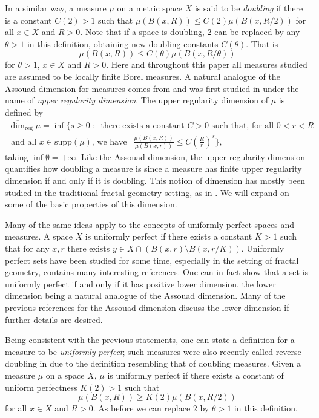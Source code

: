 In a similar way, a measure $\mu$ on a metric space $X$ is said to be \textit{doubling} if there is a constant $C(2) > 1$ such that $\mu(B(x,R)) \le C(2) \mu(B(x,R/2))$ for all $x \in X$ and $R> 0$. Note that if a space is doubling, $2$ can be replaced by any $\theta > 1$ in this definition, obtaining new doubling constants $C(\theta)$. That is 
\[
\mu(B(x,R)) \le C(\theta) \mu(B(x,R/\theta))
\]
for $\theta > 1$, $x\in X$ and $R > 0$. Here and throughout this paper all measures studied are assumed to be locally finite Borel measures. A natural analogue of the Assouad dimension for measures comes from \cite{konyagin, luksak} and was first studied in \cite{anti1} under the name of \textit{upper regularity dimension}. The upper regularity dimension of $\mu$ is defined by 
\begin{multline*} 
\overline{\dim}_{\text{reg}} \mu = \inf \Bigg\{ s \geq 0 \, \,  : \,  \text{ there exists a  constant }C  > 0\text{  such that, for all  $0< r< R $} \\ \text{  and all $x \in \text{supp} (\mu)$, we have }  \ \  \frac{\mu(B(x,R))}{\mu(B(x,r))} \leq C\left(\frac{R}{r}\right)^{s} \Bigg\},
\end{multline*}
taking $\inf \emptyset = + \infty$. Like the Assouad dimension, the upper regularity dimension quantifies how doubling a measure is since a measure has finite upper regularity dimension if and only if it is doubling. This notion of dimension has mostly been studied in the traditional fractal geometry setting, as in \cite{fraser-howroyd, hare-trosch, anti2}. We will expand on some of the basic properties of this dimension.



Many of the same ideas apply to the concepts of uniformly perfect spaces and measures. A space $X$ is uniformly perfect if there exists a constant $K>1$ such that for any $x,r$ there exists $y \in X \cap( B(x,r) \setminus B(x,r/K))$. Uniformly perfect sets have been studied for some time, especially in the setting of fractal geometry, \cite{heinonen} contains many interesting references. One can in fact show that a set is uniformly perfect if and only if it has positive lower dimension, the lower dimension being a natural analogue of the Assouad dimension. Many of the previous references for the Assouad dimension discuss the lower dimension if further details are desired.

Being consistent with the previous statements, one can state a definition for a measure to be \textit{uniformly perfect}; such measures were also recently called reverse-doubling in \cite{anti2} due to the definition resembling that of doubling measures. Given a measure $\mu$ on a space $X$, $\mu$ is uniformly perfect if there exists a constant of uniform perfectness $K(2) > 1$ such that
\[
\mu(B(x,R)) \ge K(2) \mu(B(x,R/2))
\]
for all $x\in X$ and $R > 0$. As before we can replace $2$ by $\theta > 1$ in this definition. 

